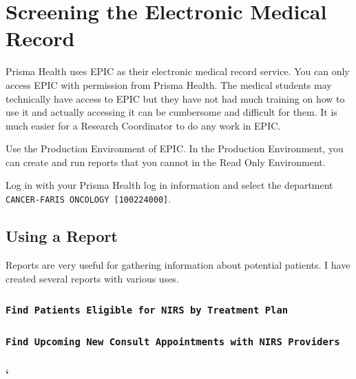 \documentclass[
]{book}
\begin{document}
\hypertarget{screening-the-electronic-medical-record}{%
\section{Screening the Electronic Medical Record}\label{screening-the-electronic-medical-record}}

Prisma Health uses EPIC as their electronic medical record service.
You can only access EPIC with permission from Prisma Health. The medical students may technically have access to EPIC but they have not had much training on how to use it and actually accessing it can be cumbersome and difficult for them. It is much easier for a Research Coordinator to do any work in EPIC.

Use the Production Environment of EPIC. In the Production Environment, you can create and run reports that you cannot in the Read Only Environment.

Log in with your Prisma Health log in information and select the department \texttt{CANCER-FARIS\ ONCOLOGY\ {[}100224000{]}}.

\hypertarget{using-a-report}{%
\subsection{Using a Report}\label{using-a-report}}

Reports are very useful for gathering information about potential patients. I have created several reports with various uses.

\hypertarget{find-patients-eligible-for-nirs-by-treatment-plan}{%
\subsubsection{\texorpdfstring{\texttt{Find\ Patients\ Eligible\ for\ NIRS\ by\ Treatment\ Plan}}{Find Patients Eligible for NIRS by Treatment Plan}}\label{find-patients-eligible-for-nirs-by-treatment-plan}}

\hypertarget{find-upcoming-new-consult-appointments-with-nirs-providers}{%
\subsubsection{\texorpdfstring{\texttt{Find\ Upcoming\ New\ Consult\ Appointments\ with\ NIRS\ Providers}}{Find Upcoming New Consult Appointments with NIRS Providers}}\label{find-upcoming-new-consult-appointments-with-nirs-providers}}

\hypertarget{section}{%
\subsubsection{`}\label{section}}
\end{document}
